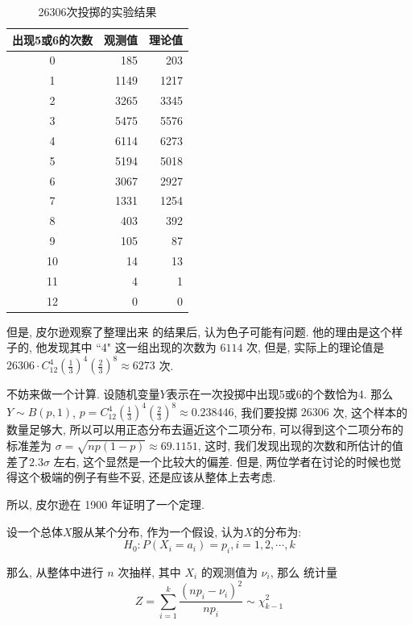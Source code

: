 				\begin{table}[h]
					\centering
					\begin{tabular}[c]{crr}
						\toprule[1.5pt]
  						出现5或6的次数 & 观测值 & 理论值\\
						\midrule[1.5pt]
					    0 & 185 & 203 \\
						1 & 1149 & 1217 \\
						2 & 3265 & 3345 \\
						3 & 5475 & 5576 \\
						4 & 6114 & 6273 \\
						5 & 5194 & 5018 \\
						6 & 3067 & 2927 \\
						7 & 1331 & 1254 \\
						8 & 403 & 392 \\
						9 & 105 & 87 \\
						10 & 14 & 13 \\
						11 & 4 & 1 \\
						12 & 0 & 0 \\
						\bottomrule[1.5pt]
					\end{tabular}
					\caption{26306次投掷的实验结果}
				\end{table}

			
			但是, 皮尔逊观察了整理出来 的结果后, 认为色子可能有问题.	他的理由是这个样子的, 他发现其中 ``4" 这一组出现的次数为 $6114$ 次, 但是, 实际上的理论值是 $26306 \cdot C_{12}^4 (\frac{1}{3})^4(\frac{2}{3})^8 \approx 6273$ 次. 
			
			不妨来做一个计算. 设随机变量$Y$表示在一次投掷中出现5或6的个数恰为4. 那么 $Y \sim B(p, 1)$, $p = C_{12}^4 (\frac{1}{3})^4(\frac{2}{3})^8 \approx 0.238446$, 我们要投掷 $26306$ 次, 这个样本的数量足够大, 所以可以用正态分布去逼近这个二项分布, 可以得到这个二项分布的标准差为 $\sigma =\sqrt{np(1-p)} \approx  69.1151 $, 这时, 我们发现出现的次数和所估计的值差了$2.3\sigma$ 左右, 这个显然是一个比较大的偏差. 但是, 两位学者在讨论的时候也觉得这个极端的例子有些不妥, 还是应该从整体上去考虑.
			
			所以, 皮尔逊在 1900 年证明了一个定理. 
			\begin{theorem}
				设一个总体$X$服从某个分布, 作为一个假设, 认为$X$的分布为:
				\begin{equation}
					H_0: P(X_i = a_i) = p_i, i = 1, 2, \cdots, k
				\end{equation}
				
				那么, 从整体中进行 $n$ 次抽样, 其中 $X_i$ 的观测值为 $\nu_i$, 那么 统计量 
				\begin{equation}					
					Z = \sum_{i=1}^{k} \frac{(np_i - \nu_i)^2}{np_i} \sim \chi^2_{k-1}
				\end{equation}
			\end{theorem}
			
